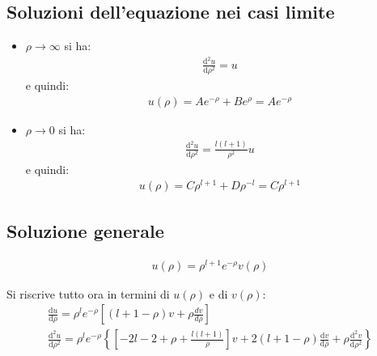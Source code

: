 \subsection{Soluzioni dell'equazione nei casi limite} %
\begin{itemize}
\item $\rho \rightarrow \infty $ si ha:
\begin{equation}\begin{split}
\frac{\textrm{d}^2u}{\textrm{d}\rho^2}=u
\end{split}\end{equation}
e quindi:
\begin{equation}\begin{split}
u\left(\rho\right)=Ae^{-\rho}+Be^{\rho}=Ae^{-\rho}
\end{split}\end{equation}

\item $\rho \rightarrow 0$ si ha:
\begin{equation}\begin{split}
\frac{\textrm{d}^2u}{\textrm{d}\rho^2}=\frac{l\left(l+1\right)}{\rho^2}u
\end{split}\end{equation}
e quindi:
\begin{equation}\begin{split}
u\left(\rho\right)=C\rho^{l+1}+D\rho^{-l}=C\rho^{l+1}
\end{split}\end{equation}
\end{itemize}

\subsection{Soluzione generale} %
\begin{equation}\begin{split}
u\left(\rho\right)=\rho^{l+1}e^{-\rho}v\left(\rho\right)
\end{split}\end{equation}

Si riscrive tutto ora in termini di $u\left(\rho\right)$ e di $v\left(\rho\right)$:
\begin{equation}\begin{split}
\frac{\textrm{d}u}{\textrm{d}\rho}=\rho^le^{-\rho}\left[\left(l+1-\rho\right)v+\rho\frac{dv}{d\rho}\right] \\
\frac{\textrm{d}^2u}{\textrm{d}\rho^2}=\rho^le^{-\rho}\left\{\left[-2l-2+\rho+\frac{l\left(l+1\right)}{\rho}\right]v+2\left(l+1-\rho\right)\frac{\textrm{d}v}{\textrm{d}\rho}+\rho\frac{\textrm{d}^2v}{\textrm{d}\rho^2}\right\}
\end{split}\end{equation}

